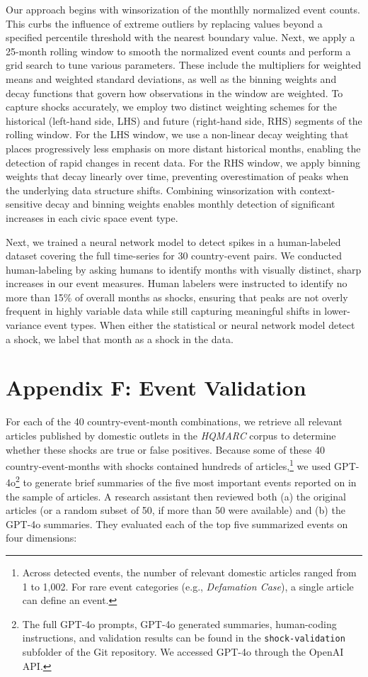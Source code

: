 \documentclass[
  letterpaper,
  DIV=11,
  numbers=noendperiod]{scrartcl}
\begin{document}
Our approach begins with winsorization of the monthlly normalized event
counts. This curbs the influence of extreme outliers by replacing values
beyond a specified percentile threshold with the nearest boundary value.
Next, we apply a 25-month rolling window to smooth the normalized event
counts and perform a grid search to tune various parameters. These
include the multipliers for weighted means and weighted standard
deviations, as well as the binning weights and decay functions that
govern how observations in the window are weighted. To capture shocks
accurately, we employ two distinct weighting schemes for the historical
(left-hand side, LHS) and future (right-hand side, RHS) segments of the
rolling window. For the LHS window, we use a non-linear decay weighting
that places progressively less emphasis on more distant historical
months, enabling the detection of rapid changes in recent data. For the
RHS window, we apply binning weights that decay linearly over time,
preventing overestimation of peaks when the underlying data structure
shifts. Combining winsorization with context-sensitive decay and binning
weights enables monthly detection of significant increases in each civic
space event type.

Next, we trained a neural network model to detect spikes in a
human-labeled dataset covering the full time-series for 30 country-event
pairs. We conducted human-labeling by asking humans to identify months
with visually distinct, sharp increases in our event measures. Human
labelers were instructed to identify no more than 15\% of overall months
as shocks, ensuring that peaks are not overly frequent in highly
variable data while still capturing meaningful shifts in lower-variance
event types. When either the statistical or neural network model detect
a shock, we label that month as a shock in the data.

\section{Appendix F: Event
Validation}\label{appendix-f-event-validation}

For each of the 40 country-event-month combinations, we retrieve all
relevant articles published by domestic outlets in the \emph{HQMARC}
corpus to determine whether these shocks are true or false positives.
Because some of these 40 country-event-months with shocks contained
hundreds of articles,\footnote{Across detected events, the number of
  relevant domestic articles ranged from 1 to 1,002. For rare event
  categories (e.g., \emph{Defamation Case}), a single article can define
  an event.} we used GPT-4o\footnote{The full GPT-4o prompts, GPT-4o
  generated summaries, human-coding instructions, and validation results
  can be found in the \texttt{shock-validation} subfolder of the Git
  repository. We accessed GPT-4o through the OpenAI API.} to generate
brief summaries of the five most important events reported on in the
sample of articles. A research assistant then reviewed both (a) the
original articles (or a random subset of 50, if more than 50 were
available) and (b) the GPT-4o summaries. They evaluated each of the top
five summarized events on four dimensions:
\end{document}
